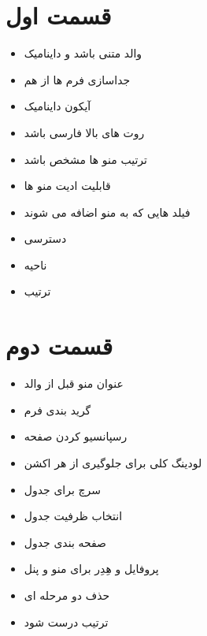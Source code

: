 \documentclass[12pt]{article}
\begin{document}


\section{قسمت اول}


\begin{itemize}
	\item والد متنی باشد و داینامیک
	\item جداسازی فرم ها از هم
	\item آیکون داینامیک
	\item روت های بالا فارسی باشد
	\item ترتیب منو ها مشخص باشد
	\item قابلیت ادیت منو ها
	\item فیلد هایی که به منو اضافه می شوند
	\item دسترسی
	\item ناحیه
	\item ترتیب
\end{itemize}



\section{قسمت دوم}


\begin{itemize}
	\item عنوان منو قبل از والد
	\item گرید بندی فرم
	\item رسپانسیو کردن صفحه
	\item لودینگ کلی برای جلوگیری از هر اکشن
	\item سرچ برای جدول
	\item انتخاب ظرفیت جدول
	\item صفحه بندی جدول
	\item پروفایل و هِدِر برای منو و پنل
	\item حذف دو مرحله ای
	\item ترتیب درست شود
\end{itemize}
\end{document}
